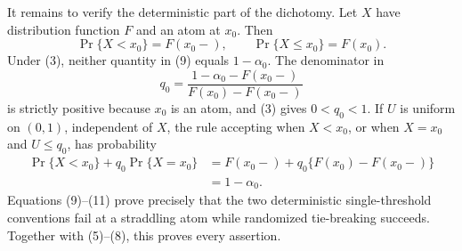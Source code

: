 It remains to verify the deterministic part of the dichotomy.  Let \(X\) have distribution function \(F\) and an atom at \(x_0\).  Then
\[
 \Pr\{X<x_0\}=F(x_0-),
 \qquad
 \Pr\{X\leq x_0\}=F(x_0).                                  \tag{9}
\]
Under (3), neither quantity in (9) equals \(1-\alpha_0\).  The denominator in
\[
 q_0=
 \frac{1-\alpha_0-F(x_0-)}{F(x_0)-F(x_0-)}                    \tag{10}
\]
is strictly positive because \(x_0\) is an atom, and (3) gives \(0<q_0<1\).  If \(U\) is uniform on \((0,1)\), independent of \(X\), the rule accepting when \(X<x_0\), or when \(X=x_0\) and \(U\leq q_0\), has probability
\[
 \begin{aligned}
 \Pr\{X<x_0\}+q_0\Pr\{X=x_0\}
 &=F(x_0-)+q_0\{F(x_0)-F(x_0-)\}\\
 &=1-\alpha_0.                                                \tag{11}
 \end{aligned}
\]
Equations (9)--(11) prove precisely that the two deterministic single-threshold conventions fail at a straddling atom while randomized tie-breaking succeeds.  Together with (5)--(8), this proves every assertion.
